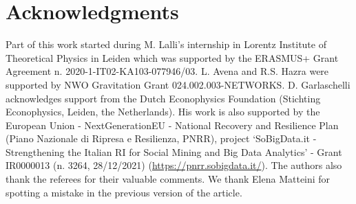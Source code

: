 \documentclass[11pt, reqno]{amsart}
\numberwithin{equation}{section}
\theoremstyle{plain} %
\theoremstyle{definition} %
\begin{document}
\section*{{Acknowledgments}} 
{Part of this work started during M. Lalli's internship in Lorentz Institute of Theoretical Physics in Leiden which was supported by the ERASMUS+ Grant Agreement n. 2020-1-IT02-KA103-077946/03. L. Avena and R.S. Hazra were supported by NWO Gravitation Grant 024.002.003-NETWORKS. 
D. Garlaschelli acknowledges support from the Dutch Econophysics Foundation (Stichting Econophysics, Leiden, the Netherlands). His work is also supported by the European Union - NextGenerationEU - National Recovery and Resilience Plan (Piano Nazionale di Ripresa e Resilienza, PNRR), project `SoBigData.it - Strengthening the Italian RI for Social Mining and Big Data Analytics' - Grant IR0000013 (n. 3264, 28/12/2021) (\url{https://pnrr.sobigdata.it/}). The authors also thank the referees for their valuable comments. We thank Elena Matteini for spotting a mistake in the previous version of the article. 

}





\end{document}
